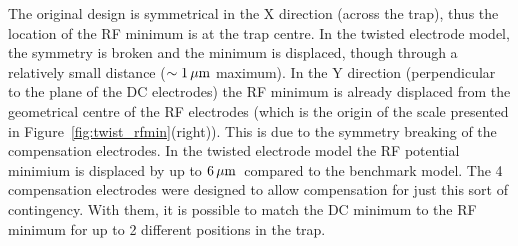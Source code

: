 The original design is symmetrical in the X direction (across the trap), thus the location of the RF minimum is at the trap centre. In the twisted electrode model, the symmetry is broken and the minimum is displaced, though through a relatively small distance ($\sim 1\,\mbox{$\mu$m}$ maximum). In the Y direction (perpendicular to the plane of the DC electrodes) the RF minimum is already displaced from the geometrical centre of the RF electrodes (which is the origin of the scale presented in Figure~\ref{fig:twist_rfmin}(right)). This is due to the symmetry breaking of the compensation electrodes. In the twisted electrode model the RF potential minimium is displaced by up to $6\,\mbox{$\mu$m}$\, compared to the benchmark model. The 4 compensation electrodes were designed to allow compensation for just this sort of contingency. With them, it is possible to match the DC minimum to the RF minimum for up to 2 different positions in the trap. 

